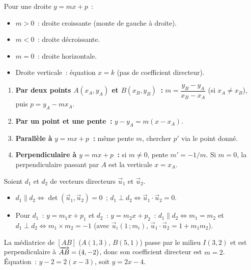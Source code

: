 \begin{prop}
Pour une droite $y=mx+p$~:
\begin{itemize}
  \item $m>0$~: droite croissante (monte de gauche \`a droite).
  \item $m<0$~: droite d\'ecroissante.
  \item $m=0$~: droite horizontale.
  \item Droite verticale~: \'equation $x=k$ (pas de coefficient directeur).
\end{itemize}
\end{prop}

\begin{methode}
\begin{enumerate}
  \item \textbf{Par deux points $A(x_A,y_A)$ et $B(x_B,y_B)$~:}
        $m = \dfrac{y_B-y_A}{x_B-x_A}$ (si $x_A\ne x_B$),
        puis $p = y_A - mx_A$.
  \item \textbf{Par un point et une pente~:}
        $y - y_A = m(x-x_A)$.
  \item \textbf{Parall\`ele \`a $y=mx+p$~:} m\^eme pente $m$, chercher $p'$
        via le point donn\'e.
  \item \textbf{Perpendiculaire \`a $y=mx+p$~:} si $m\ne0$, pente $m'=-1/m$.
        Si $m=0$, la perpendiculaire passant par $A$ est la verticale $x=x_A$.
\end{enumerate}
\end{methode}

\begin{prop}
Soient $d_1$ et $d_2$ de vecteurs directeurs $\vec u_1$ et $\vec u_2$.
\begin{itemize}
  \item $d_1 \parallel d_2 \Leftrightarrow \det(\vec u_1,\vec u_2)=0$~;
        $d_1 \perp d_2 \Leftrightarrow \vec u_1\cdot\vec u_2=0$.
  \item Pour $d_1$~: $y=m_1x+p_1$ et $d_2$~: $y=m_2x+p_2$~:
        $d_1 \parallel d_2 \Leftrightarrow m_1=m_2$ et
        $d_1 \perp d_2 \Leftrightarrow m_1\times m_2 = -1$
        (avec $\vec u_i(1\,;m_i)$, $\vec u_1\cdot\vec u_2=1+m_1m_2$).
\end{itemize}
\end{prop}

\begin{ex}
La m\'ediatrice de $[AB]$ ($A(1,3)$, $B(5,1)$) passe par le milieu
$I(3,2)$ et est perpendiculaire \`a $\overrightarrow{AB}=(4,-2)$,
donc son coefficient directeur est $m=2$.
\'Equation~: $y-2 = 2(x-3)$, soit $y=2x-4$.
\end{ex}

